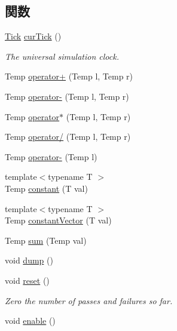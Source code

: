 \subsection*{関数}
\begin{DoxyCompactItemize}
\item 
\hyperlink{base_2types_8hh_a5c8ed81b7d238c9083e1037ba6d61643}{Tick} \hyperlink{statistics_8hh_a7acdccbf0d35ce0c159c0cdd36371b22}{curTick} ()
\begin{DoxyCompactList}\small\item\em The universal simulation clock. \item\end{DoxyCompactList}\item 
Temp \hyperlink{namespaceStats_ad753c7cf585098bfeb9428b578549f6d}{operator+} (Temp l, Temp r)
\item 
Temp \hyperlink{namespaceStats_a9f11fd33efc0c7c48e3bf613faa5f859}{operator-\/} (Temp l, Temp r)
\item 
Temp \hyperlink{namespaceStats_a0f00b6da1f44e697da7eccba495d94ef}{operator$\ast$} (Temp l, Temp r)
\item 
Temp \hyperlink{namespaceStats_a4503ae7ebd767375e5beef0eb2090eb0}{operator/} (Temp l, Temp r)
\item 
Temp \hyperlink{namespaceStats_aa6b877c1ac1451430742f23cdd1a6690}{operator-\/} (Temp l)
\item 
{\footnotesize template$<$typename T $>$ }\\Temp \hyperlink{namespaceStats_aee7bc2d5f58c9e1c5d24007800542032}{constant} (T val)
\item 
{\footnotesize template$<$typename T $>$ }\\Temp \hyperlink{namespaceStats_a60d2ae8cfe1fa437cac8afbeab4999da}{constantVector} (T val)
\item 
Temp \hyperlink{namespaceStats_adb8b0b9d553e52514e3db14f6bf7c449}{sum} (Temp val)
\item 
void \hyperlink{namespaceStats_a0f20c2022d6828b0b8f40e78824bc4a3}{dump} ()
\item 
void \hyperlink{namespaceStats_ab9cd159e7f4ac914ca3db1a14ff1d8a8}{reset} ()
\begin{DoxyCompactList}\small\item\em Zero the number of passes and failures so far. \item\end{DoxyCompactList}\item 
void \hyperlink{namespaceStats_a486f22824bd83c5308a0d70ffac6f758}{enable} ()

\end{DoxyCompactItemize}
